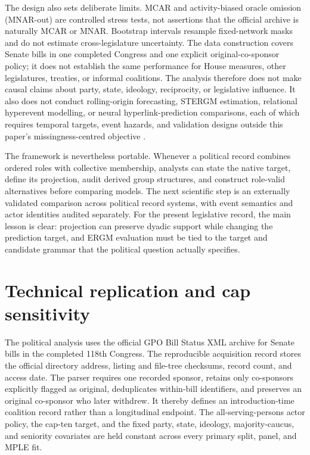 \documentclass{nws}
\begin{document}
The design also sets deliberate limits. MCAR and activity-biased oracle omission (MNAR-out) are controlled stress tests, not assertions that the official archive is naturally MCAR or MNAR. Bootstrap intervals resample fixed-network masks and do not estimate cross-legislature uncertainty. The data construction covers Senate bills in one completed Congress and one explicit original-co-sponsor policy; it does not establish the same performance for House measures, other legislatures, treaties, or informal coalitions. The analysis therefore does not make causal claims about party, state, ideology, reciprocity, or legislative influence. It also does not conduct rolling-origin forecasting, STERGM estimation, relational hyperevent modelling, or neural hyperlink-prediction comparisons, each of which requires temporal targets, event hazards, and validation designs outside this paper's missingness-centred objective \citep{lernerLomi2023}.

The framework is nevertheless portable. Whenever a political record combines ordered roles with collective membership, analysts can state the native target, define its projection, audit derived group structures, and construct role-valid alternatives before comparing models. The next scientific step is an externally validated comparison across political record systems, with event semantics and actor identities audited separately. For the present legislative record, the main lesson is clear: projection can preserve dyadic support while changing the prediction target, and ERGM evaluation must be tied to the target and candidate grammar that the political question actually specifies.

\appendix

\section{Technical replication and cap sensitivity}\label{app:technical-note}

The political analysis uses the official GPO Bill Status XML archive for Senate bills in the completed 118th Congress. The reproducible acquisition record stores the official directory address, listing and file-tree checksums, record count, and access date. The parser requires one recorded sponsor, retains only co-sponsors explicitly flagged as original, deduplicates within-bill identifiers, and preserves an original co-sponsor who later withdrew. It thereby defines an introduction-time coalition record rather than a longitudinal endpoint. The all-serving-persons actor policy, the cap-ten target, and the fixed party, state, ideology, majority-caucus, and seniority covariates are held constant across every primary split, panel, and MPLE fit.
\end{document}
